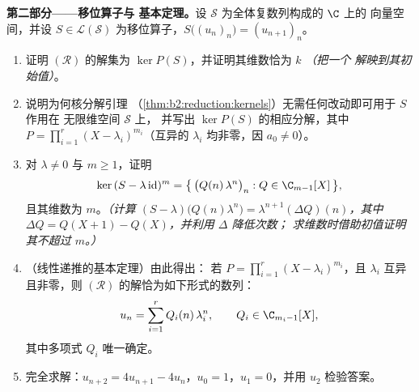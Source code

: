 \begin{problem}
\medskip
\noindent\textbf{第二部分——移位算子与
基本定理。}设 $\mathcal{S}$ 为全体复数列构成的 $\C$ 上的
向量空间，并设 $S \in
\mathcal{L}(\mathcal{S})$ 为移位算子，$S\bigl((u_n)_n\bigr) =
(u_{n+1})_n$。
\begin{enumerate}[resume]
  \item 证明 $(\mathcal R)$ 的解集为 $\ker
        P(S)$，并证明其维数恰为 $k$ \emph{（把一个
        解映到其初始值）}。
  \item 说明为何核分解引理
        （\cref{thm:b2:reduction:kernels}）无需任何改动即可用于 $S$ 作用在
        无限维空间 $\mathcal{S}$ 上，
        并写出 $\ker P(S)$ 的相应分解，其中
        $P = \prod_{i=1}^{r}(X - \lambda_i)^{m_i}$（互异的
        $\lambda_i$ 均非零，因 $a_0 \neq 0$）。
  \item 对 $\lambda \neq 0$ 与 $m \geq 1$，证明
        \[
        \ker\,(S - \lambda\,\mathrm{id})^m
        = \bigl\{\,\bigl(Q(n)\,\lambda^n\bigr)_n : Q \in
        \C_{m-1}[X]\,\bigr\},
        \]
        且其维数为 $m$。\emph{（计算 $(S -
        \lambda)\bigl(Q(n)\lambda^n\bigr) =
        \lambda^{n+1}(\Delta Q)(n)$，其中 $\Delta Q = Q(X + 1) -
        Q(X)$，并利用 $\Delta$ 降低次数；
        求维数时借助初值证明其不超过 $m$。）}
  \item （线性递推的基本定理）由此得出：
        若 $P = \prod_{i=1}^{r}(X - \lambda_i)^{m_i}$，且
        $\lambda_i$ 互异且非零，则
        $(\mathcal R)$ 的解恰为如下形式的数列：
        \[
        u_n = \sum_{i=1}^{r} Q_i(n)\,\lambda_i^n,
        \qquad Q_i \in \C_{m_i - 1}[X],
        \]
        其中多项式 $Q_i$ 唯一确定。
  \item 完全求解：$u_{n+2} = 4u_{n+1} - 4u_n$，$u_0 =
        1$，$u_1 = 0$，并用 $u_2$ 检验答案。
\end{enumerate}


\end{problem}
